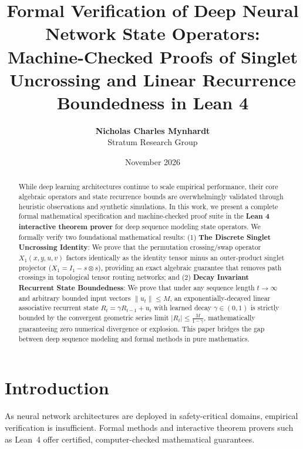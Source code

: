 \documentclass[11pt,a4paper]{article}
\title{\textbf{Formal Verification of Deep Neural Network State Operators: Machine-Checked Proofs of Singlet Uncrossing and Linear Recurrence Boundedness in Lean 4}}
\author{
  \textbf{Nicholas Charles Mynhardt} \\
  Stratum Research Group
}
\date{November 2026}
\theoremstyle{definition}
\begin{document}
\maketitle

\begin{abstract}
While deep learning architectures continue to scale empirical performance, their core algebraic operators and state recurrence bounds are overwhelmingly validated through heuristic observations and synthetic simulations. In this work, we present a complete formal mathematical specification and machine-checked proof suite in the \textbf{Lean 4 interactive theorem prover} for deep sequence modeling state operators. We formally verify two foundational mathematical results:
(1) \textbf{The Discrete Singlet Uncrossing Identity}: We prove that the permutation crossing/swap operator $X_1(x, y, u, v)$ factors identically as the identity tensor minus an outer-product singlet projector ($X_1 = I_1 - s \otimes s$), providing an exact algebraic guarantee that removes path crossings in topological tensor routing networks; and
(2) \textbf{Decay Invariant Recurrent State Boundedness}: We prove that under any sequence length $t \to \infty$ and arbitrary bounded input vectors $\|u_t\| \le M$, an exponentially-decayed linear associative recurrent state $R_t = \gamma R_{t-1} + u_t$ with learned decay $\gamma \in (0, 1)$ is strictly bounded by the convergent geometric series limit $|R_t| \le \frac{M}{1 - \gamma}$, mathematically guaranteeing zero numerical divergence or explosion. This paper bridges the gap between deep sequence modeling and formal methods in pure mathematics.
\end{abstract}

\section{Introduction}
As neural network architectures are deployed in safety-critical domains, empirical verification is insufficient. Formal methods and interactive theorem provers such as Lean~4 offer certified, computer-checked mathematical guarantees.
\end{document}
